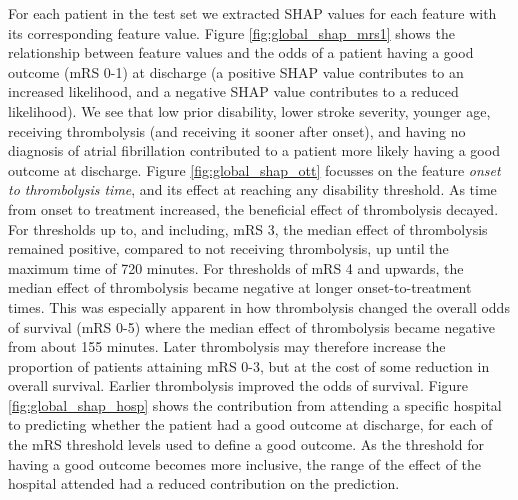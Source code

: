 For each patient in the test set we extracted SHAP values for each feature with its corresponding feature value. Figure \ref{fig:global_shap_mrs1} shows the relationship between feature values and the odds of a patient having a good outcome (mRS 0-1) at discharge (a positive SHAP value contributes to an increased likelihood, and a negative SHAP value contributes to a reduced likelihood). We see that low prior disability, lower stroke severity, younger age, receiving thrombolysis (and receiving it sooner after onset), and having no diagnosis of atrial fibrillation contributed to a patient more likely having a good outcome at discharge. Figure \ref{fig:global_shap_ott} focusses on the feature \textit{onset to thrombolysis time}, and its effect at reaching any disability threshold. As time from onset to treatment increased, the beneficial effect of thrombolysis decayed. For thresholds up to, and including, mRS 3, the median effect of thrombolysis remained positive, compared to not receiving thrombolysis, up until the maximum time of 720 minutes. For thresholds of mRS 4 and upwards, the median effect of thrombolysis became negative at longer onset-to-treatment times. This was especially apparent in how thrombolysis changed the overall odds of survival (mRS 0-5) where the median effect of thrombolysis became negative from about 155 minutes. Later thrombolysis may therefore increase the proportion of patients attaining mRS 0-3, but at the cost of some reduction in overall survival. Earlier thrombolysis improved the odds of survival. Figure \ref{fig:global_shap_hosp} shows the contribution from attending a specific hospital to predicting whether the patient had a good outcome at discharge, for each of the mRS threshold levels used to define a good outcome. As the threshold for having a good outcome becomes more inclusive, the range of the effect of the hospital attended had a reduced contribution on the prediction.



